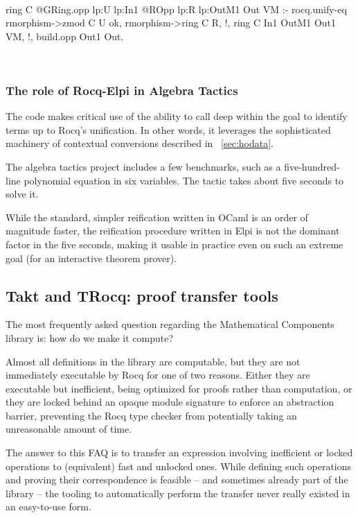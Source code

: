 \documentclass[a4paper, 11pt]{book}
\newenvironment{elpicode}
  {\VerbatimEnvironment~\\\begin{elpibox}\begin{xelpicode}}{\end{xelpicode}
\end{elpibox}\\}
\begin{document}
\begin{elpicode}
ring C {{ @GRing.opp lp:U lp:In1 }} {{ @ROpp lp:R lp:OutM1 }} Out VM :-
  rocq.unify-eq { rmorphism->zmod C } U ok,
  rmorphism->ring C R, !,
  ring C In1 OutM1 Out1 VM, !,
  build.opp Out1 Out.  
\end{elpicode}

\subsubsection{The role of Rocq-Elpi in Algebra Tactics}


The code makes critical use of the ability to call  deep
within the goal to identify terms up to Rocq's unification. In other words, it
leverages the sophisticated machinery of contextual conversions described in
~\cref{sec:hodata}.

The algebra tactics project includes a few benchmarks, such as a
five-hundred-line polynomial equation in six variables. The  tactic takes about
five seconds to solve it.

While the standard, simpler reification written in OCaml is an order of
magnitude faster, the reification procedure written in Elpi is not the dominant
factor in the five seconds, making it usable in practice even on such an
extreme goal (for an interactive theorem prover).


\subsection{Takt and TRocq: proof transfer tools}


The most frequently asked question regarding the Mathematical Components
library is: how do we make it compute?

Almost all definitions in the library are computable, but they are not
immediately executable by Rocq for one of two reasons. Either they are
executable but inefficient, being optimized for proofs rather than
computation, or they are locked behind an opaque module signature to enforce
an abstraction barrier, preventing the Rocq type checker from potentially
taking an unreasonable amount of time.

The answer to this FAQ is to transfer an expression involving inefficient or
locked operations to (equivalent) fast and unlocked ones. While defining such
operations and proving their correspondence is feasible -- and sometimes already
part of the library -- the tooling to automatically perform the transfer never
really existed in an easy-to-use form.
\end{document}
